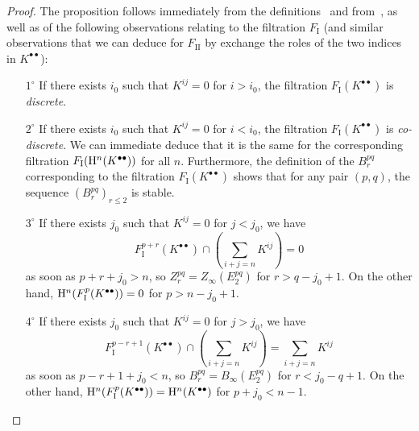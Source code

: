 \begin{proof}
The proposition follows immediately from the definitions~ and from~, 
as well as of the following observations relating to the filtration $F_\text{I}$
(and similar observations that we can deduce for $F_\text{II}$ by exchange the roles of the two indices in $K^{\bullet\bullet}$):
\begin{enumerate}
  \item[{$1^{\circ}$}] If there exists $i_0$ such that $K^{ij}=0$ for $i>i_0$, the filtration $F_\text{I}(K^{\bullet\bullet})$ is \emph{discrete}.
  \item[{$2^{\circ}$}] If there exists $i_0$ such that $K^{ij}=0$ for $i<i_0$, the filtration $F_\text{I}(K^{\bullet\bullet})$ is \emph{co-discrete}.
  We can immediate deduce that it is the same for the corresponding filtration $F_\text{I}(\mathrm{H}^n(K^{\bullet\bullet}))$ for all $n$. 
  Furthermore, the definition of the $B_{r}^{pq}$ corresponding to the filtration $F_\text{I}(K^{\bullet\bullet})$ 
  shows that for any pair $(p,q)$, the sequence $(B_{r}^{pq})_{r\leq{2}}$ is stable.
  \item[{$3^{\circ}$}] If there exists $j_0$ such that $K^{ij}=0$ for $j<j_0$, we have 
  \[
    F_\text{I}^{p+r}(K^{\bullet\bullet}) \cap (\sum_{i+j=n}K^{ij}) = 0
  \]
  as soon as $p+r+j_{0}>n$, so $Z_{r}^{pq} = Z_\infty(E_2^{pq})$ for $r>q-j_{0}+1$.
  On the other hand, $\mathrm{H}^{n}(F_\text{I}^{p}(K^{\bullet\bullet})) = 0$ for $p>n-j_{0}+1$.
  \item[{$4^{\circ}$}] If there exists $j_0$ such that $K^{ij}=0$ for $j>j_0$, we have 
  \[
    F_\text{I}^{p-r+1}(K^{\bullet\bullet}) \cap (\sum_{i+j=n}K^{ij}) = \sum_{i+j=n}K^{ij}
  \]
  as soon as $p-r+1+j_{0}<n$, so $B_{r}^{pq} = B_\infty(E_2^{pq})$ for $r<j_{0}-q+1$.
  On the other hand, $\mathrm{H}^{n}(F_\text{I}^{p}(K^{\bullet\bullet})) = \mathrm{H}^{n}(K^{\bullet\bullet})$ for $p+j_{0}<n-1$.
\end{enumerate}
\end{proof}

